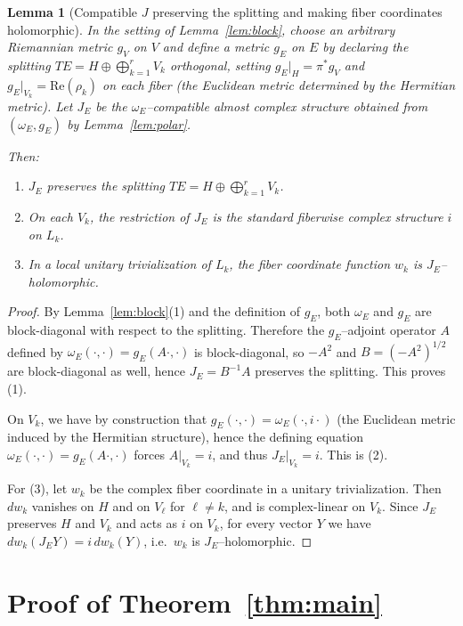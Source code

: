 \documentclass[11pt]{article}
\newtheorem{lemma}[theorem]{Lemma}
\theoremstyle{definition}
\begin{document}
\begin{lemma}[Compatible $J$ preserving the splitting and making fiber coordinates holomorphic]\label{lem:Jholo}
In the setting of Lemma~\ref{lem:block}, choose an arbitrary Riemannian metric $g_V$ on $V$ and define a metric $g_E$ on $E$
by declaring the splitting $TE = H \oplus \bigoplus_{k=1}^r V_k$ orthogonal, setting $g_E|_H=\pi^\ast g_V$ and
$g_E|_{V_k}=\mathrm{Re}(\rho_k)$ on each fiber (the Euclidean metric determined by the Hermitian metric).
Let $J_E$ be the $\omega_E$--compatible almost complex structure obtained from $(\omega_E,g_E)$ by Lemma~\ref{lem:polar}.

Then:
\begin{enumerate}
\item $J_E$ preserves the splitting $TE = H \oplus \bigoplus_{k=1}^r V_k$.
\item On each $V_k$, the restriction of $J_E$ is the standard fiberwise complex structure $i$ on $L_k$.
\item In a local unitary trivialization of $L_k$, the fiber coordinate function $w_k$ is $J_E$--holomorphic.
\end{enumerate}
\end{lemma}

\begin{proof}
By Lemma~\ref{lem:block}(1) and the definition of $g_E$, both $\omega_E$ and $g_E$ are block-diagonal with respect to the
splitting. Therefore the $g_E$--adjoint operator $A$ defined by $\omega_E(\cdot,\cdot)=g_E(A\cdot,\cdot)$ is block-diagonal,
so $-A^2$ and $B=(-A^2)^{1/2}$ are block-diagonal as well, hence $J_E=B^{-1}A$ preserves the splitting. This proves (1).

On $V_k$, we have by construction that $g_E(\cdot,\cdot)=\omega_E(\cdot,i\cdot)$ (the Euclidean metric induced by the Hermitian
structure), hence the defining equation $\omega_E(\cdot,\cdot)=g_E(A\cdot,\cdot)$ forces $A|_{V_k}=i$, and thus
$J_E|_{V_k}=i$. This is (2).

For (3), let $w_k$ be the complex fiber coordinate in a unitary trivialization. Then $dw_k$ vanishes on $H$ and on $V_\ell$ for
$\ell\neq k$, and is complex-linear on $V_k$. Since $J_E$ preserves $H$ and $V_k$ and acts as $i$ on $V_k$,
for every vector $Y$ we have $dw_k(J_EY)=i\,dw_k(Y)$, i.e.\ $w_k$ is $J_E$--holomorphic.
\end{proof}

\section{Proof of Theorem~\ref{thm:main}}
\end{document}
